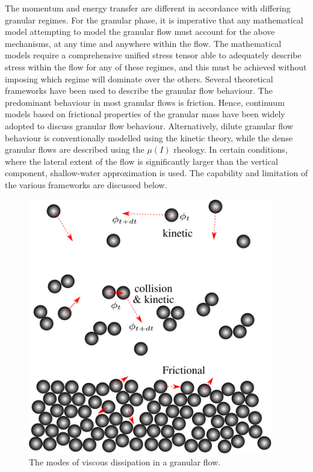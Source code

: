 The momentum and energy transfer are different in accordance with differing 
granular regimes. For the granular phase, it is 
imperative that any mathematical model attempting to model the granular flow 
must account for the above mechanisms, at any time and anywhere within the 
flow. The mathematical models require a comprehensive unified stress tensor 
able to adequately describe stress within the flow for any of these regimes, 
and this must be achieved without imposing which regime will dominate over the 
others. Several theoretical frameworks have been used to describe the granular 
flow behaviour. The predominant behaviour in most granular flows is friction. 
Hence, continuum models based on frictional properties of the granular mass 
have been widely adopted to discuss granular flow behaviour. Alternatively, 
dilute granular flow behaviour is conventionally modelled using the kinetic 
theory, while the dense granular flows are described using the $\mu(I)$ 
rheology. In certain conditions, where the lateral extent of the flow is 
significantly larger than the vertical component, shallow-water approximation 
is used. The capability and limitation of the various frameworks are discussed 
below. 
%
\begin{figure}[tbhp]
\centering
\includegraphics[width=0.95\textwidth]{kinetic}
\caption{The modes of viscous dissipation in a granular flow.}
\label{fig:kinetic}
\end{figure}
%

